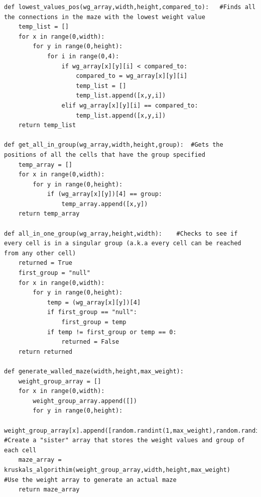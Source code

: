 \documentclass{article}
\begin{document}
\begin{lstlisting}
def lowest_values_pos(wg_array,width,height,compared_to):   #Finds all the connections in the maze with the lowest weight value
    temp_list = []
    for x in range(0,width):
        for y in range(0,height):
            for i in range(0,4):
                if wg_array[x][y][i] < compared_to:
                    compared_to = wg_array[x][y][i]
                    temp_list = []
                    temp_list.append([x,y,i])
                elif wg_array[x][y][i] == compared_to:
                    temp_list.append([x,y,i])
    return temp_list

def get_all_in_group(wg_array,width,height,group):  #Gets the positions of all the cells that have the group specified
    temp_array = []
    for x in range(0,width):
        for y in range(0,height):
            if (wg_array[x][y])[4] == group:
                temp_array.append([x,y])
    return temp_array

def all_in_one_group(wg_array,height,width):    #Checks to see if every cell is in a singular group (a.k.a every cell can be reached from any other cell)
    returned = True
    first_group = "null"
    for x in range(0,width):
        for y in range(0,height):
            temp = (wg_array[x][y])[4]
            if first_group == "null":
                first_group = temp
            if temp != first_group or temp == 0:
                returned = False                
    return returned

def generate_walled_maze(width,height,max_weight):
    weight_group_array = []                 
    for x in range(0,width):
        weight_group_array.append([])
        for y in range(0,height):
            weight_group_array[x].append([random.randint(1,max_weight),random.randint(1,max_weight),random.randint(1,max_weight),random.randint(1,max_weight),0])   #Create a "sister" array that stores the weight values and group of each cell
    maze_array = kruskals_algorithim(weight_group_array,width,height,max_weight)    #Use the weight array to generate an actual maze
    return maze_array


\end{lstlisting}
\end{document}

